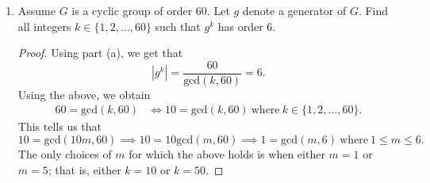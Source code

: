 \documentclass[a4paper]{article}
\begin{document}
\begin{problem}
\begin{enumerate}
\begin{proof}
            \end{proof}
        \item[(b)] Assume \( G  \) is a cyclic group of order \( 60  \). Let \( g  \) denote a generator of \( G  \). Find all integers \( k \in \{ 1,2, \dots, 60 \}  \) such that \( g^{k}  \) has order \(  6  \).
            \begin{proof}
                Using part (a), we get that 
                \[  | g^{k} |  = \frac{ 60 }{ \text{gcd}(k,60) }  = 6. \]
                Using the above, we obtain 
                \begin{align*} 
                    60 =  \text{gcd}(k,60) &\iff 10 = \text{gcd}(k,60) \ \text{where} \ k \in \{ 1,2,\dots,60 \}. 
                \end{align*}
                This tells us that 
                \[  10 = \text{gcd}(10m,60) \implies 10 = 10 \text{gcd}(m,60) \implies 1 = \text{gcd}(m,6) \ \text{where} \ 1 \leq m \leq 6. \]
                The only choices of \( m  \) for which the above holds is when either \( m = 1 \) or \( m = 5 \); that is, either \( k = 10 \) or \( k = 50  \).
            \end{proof}
    \end{enumerate}
\end{problem}
\end{document}
